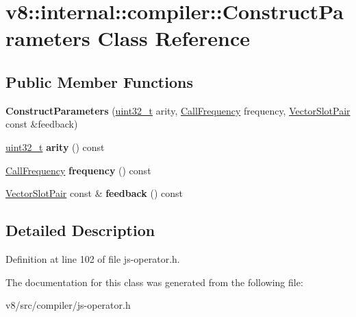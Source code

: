 \hypertarget{classv8_1_1internal_1_1compiler_1_1ConstructParameters}{}\section{v8\+:\+:internal\+:\+:compiler\+:\+:Construct\+Parameters Class Reference}
\label{classv8_1_1internal_1_1compiler_1_1ConstructParameters}
\subsection*{Public Member Functions}
\begin{DoxyCompactItemize}
\item 
\mbox{\label{classv8_1_1internal_1_1compiler_1_1ConstructParameters_ab9b1c4c325cce64a6205cf5eaa5c9043}} 
{\bfseries Construct\+Parameters} (\mbox{\hyperlink{classuint32__t}{uint32\+\_\+t}} arity, \mbox{\hyperlink{classv8_1_1internal_1_1compiler_1_1CallFrequency}{Call\+Frequency}} frequency, \mbox{\hyperlink{classv8_1_1internal_1_1VectorSlotPair}{Vector\+Slot\+Pair}} const \&feedback)
\item 
\mbox{\label{classv8_1_1internal_1_1compiler_1_1ConstructParameters_a0525da65a8a2c3d8e08c5c941021c30f}} 
\mbox{\hyperlink{classuint32__t}{uint32\+\_\+t}} {\bfseries arity} () const
\item 
\mbox{\label{classv8_1_1internal_1_1compiler_1_1ConstructParameters_af87340e45b8a36d8bc1fe3a15754bdc7}} 
\mbox{\hyperlink{classv8_1_1internal_1_1compiler_1_1CallFrequency}{Call\+Frequency}} {\bfseries frequency} () const
\item 
\mbox{\label{classv8_1_1internal_1_1compiler_1_1ConstructParameters_a993a0b984cf706082a57641d9aed9910}} 
\mbox{\hyperlink{classv8_1_1internal_1_1VectorSlotPair}{Vector\+Slot\+Pair}} const  \& {\bfseries feedback} () const
\end{DoxyCompactItemize}


\subsection{Detailed Description}


Definition at line 102 of file js-\/operator.\+h.



The documentation for this class was generated from the following file\+:\begin{DoxyCompactItemize}
\item 
v8/src/compiler/js-\/operator.\+h\end{DoxyCompactItemize}
